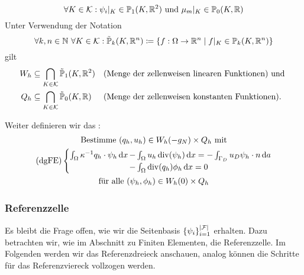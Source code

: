 \begin{remark}
	
	\[	\forall K \in \mathcal{K}:\psi_i|_K \in \mathbb{P}_1(K,\mathbb{R}^2) \text{ und } \mu_m|_K \in \mathbb{P}_0(K,\mathbb{R}) \]
	Unter Verwendung der Notation 
	\[\forall k,n \in  \mathbb{N} \ \forall K \in \mathcal{K}: \tilde{\mathbb{P}}_k(K,\mathbb{R}^n) \coloneqq \left\{  f:\Omega \to \mathbb{R}^n \mid f|_K \in \mathbb{P}_k(K, \mathbb{R}^n)  \right\}  \]
	gilt
	\begin{align*}	
	W_h &\subseteq \bigcap_{K \in \mathcal{K}} \tilde{\mathbb{P}}_1(K,\mathbb{R}^2) &&\text{(Menge der zellenweisen linearen Funktionen) und }\\
	Q_h &\subseteq \bigcap_{K \in \mathcal{K}} \tilde{\mathbb{P}}_0(K,\mathbb{R}) &&\text{(Menge der zellenweisen konstanten Funktionen)}. 
	\end{align*}	
\end{remark}

\begin{define}
	Weiter definieren wir das :
	\begin{gather*}
		\text{Bestimme } (q_h,u_h) \in W_h(-g_N) \times Q_h \text{ mit}\\
		\operatorname{(dgFE)}\begin{cases}
			\int_{\Omega} \kappa ^{-1} q_h \cdot \psi_h \mathop{}\!\mathrm{d} x \mkern-15mu &- \int_{\Omega} u_h \operatorname{div}(\psi_h) \mathop{}\!\mathrm{d} x = - \int_{\Gamma_D} u_D \psi_h \cdot n \mathop{}\!\mathrm{d} a\\
			&- \int_{\Omega} \operatorname{div}(q_h) \phi_h \mathop{}\!\mathrm{d} x = 0
		\end{cases} \\
		\text{für alle } (\psi_h, \phi_h) \in W_h(0) \times Q_h
	\end{gather*}
\end{define}
\subsubsection{Referenzzelle}

Es bleibt die Frage offen, wie wir die Seitenbasis $ \{ \psi_i \}_{i=1}^{\abs{\mathcal{F}}} $ erhalten. Dazu betrachten wir, wie im Abschnitt zu Finiten Elementen, die Referenzzelle. Im Folgenden werden wir das Referenzdreieck anschauen, analog können die Schritte für das Referenzviereck vollzogen werden. 

